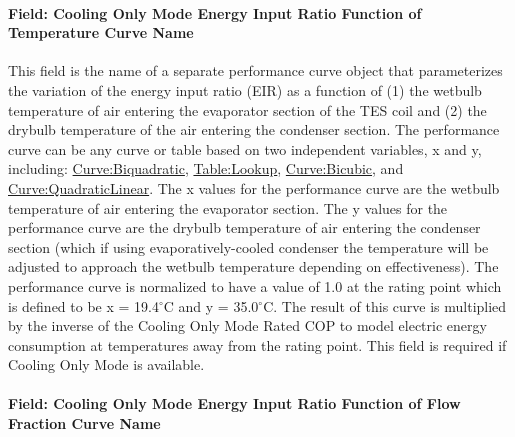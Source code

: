 \paragraph{Field: Cooling Only Mode Energy Input Ratio Function of Temperature Curve Name}\label{field-cooling-only-mode-energy-input-ratio-function-of-temperature-curve-name}

This field is the name of a separate performance curve object that parameterizes the variation of the energy input ratio (EIR) as a function of (1) the wetbulb temperature of air entering the evaporator section of the TES coil and (2) the drybulb temperature of the air entering the condenser section. The performance curve can be any curve or table based on two independent variables, x and y, including: \hyperref[curvebiquadratic]{Curve:Biquadratic}, \hyperref[tablelookup]{Table:Lookup}, \hyperref[curvebicubic]{Curve:Bicubic}, and \hyperref[curvequadraticlinear]{Curve:QuadraticLinear}. The x values for the performance curve are the wetbulb temperature of air entering the evaporator section. The y values for the performance curve are the drybulb temperature of air entering the condenser section (which if using evaporatively-cooled condenser the temperature will be adjusted to approach the wetbulb temperature depending on effectiveness). The performance curve is normalized to have a value of 1.0 at the rating point which is defined to be x = 19.4$^\circ$C and y = 35.0$^\circ$C. The result of this curve is multiplied by the inverse of the Cooling Only Mode Rated COP to model electric energy consumption at temperatures away from the rating point. This field is required if Cooling Only Mode is available.

\paragraph{Field: Cooling Only Mode Energy Input Ratio Function of Flow Fraction Curve Name}\label{field-cooling-only-mode-energy-input-ratio-function-of-flow-fraction-curve-name}

